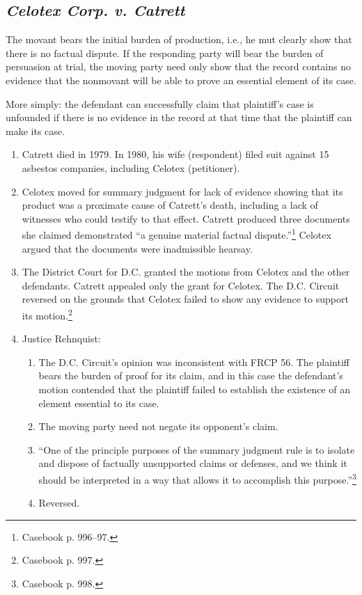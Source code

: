 \subsection{\emph{Celotex Corp. v. Catrett}}

The movant bears the initial burden of production, i.e., he mut clearly show 
that there is no factual dispute. If the responding party will bear the burden 
of persuasion at trial, the moving party need only show that the record 
contains no evidence that the nonmovant will be able to prove an essential 
element of its case.

More simply: the defendant can successfully claim that plaintiff's case is 
unfounded if there is no evidence in the record at that time that the 
plaintiff can make its case.

\begin{enumerate}
    \item Catrett died in 1979. In 1980, his wife (respondent) filed suit 
    against 15 asbestos companies, including Celotex (petitioner).
    \item Celotex moved for summary judgment for lack of evidence showing that 
    its product was a proximate cause of Catrett's death, including a lack of 
    witnesses who could testify to that effect. Catrett produced three 
    documents she claimed demonstrated ``a genuine material factual 
    dispute.''\footnote{Casebook p. 996--97.} Celotex argued that the 
    documents were inadmissible hearsay.
    \item The District Court for D.C. granted the motions from Celotex and the 
    other defendants. Catrett appealed only the grant for Celotex. The D.C. 
    Circuit reversed on the grounds that Celotex failed to show any evidence 
    to support its motion.\footnote{Casebook p. 997.}
    \item Justice Rehnquist:
    \begin{enumerate}
        \item The D.C. Circuit's opinion was inconsistent with FRCP 56. The 
        plaintiff bears the burden of proof for its claim, and in this case 
        the defendant's motion contended that the plaintiff failed to 
        establish the existence of an element essential to its case.
        \item The moving party need not negate its opponent's claim.
        \item ``One of the principle purposes of the summary judgment rule is 
        to isolate and dispose of factually unsupported claims or defenses, 
        and we think it should be interpreted in a way that allows it to 
        accomplish this purpose.''\footnote{Casebook p. 998.}
        \item Reversed.
    \end{enumerate}
\end{enumerate}

